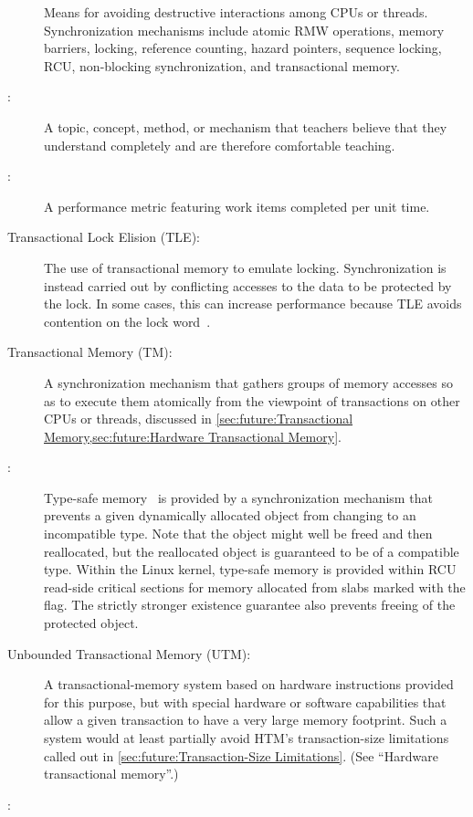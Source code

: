 \begin{description}
	Means for avoiding destructive interactions among CPUs or threads.
	Synchronization mechanisms include atomic RMW operations, memory
	barriers, locking, reference counting, hazard pointers, sequence
	locking, RCU, non-blocking synchronization, and transactional
	memory.
\item[\IXG{Teachable}:]
	A topic, concept, method, or mechanism that teachers believe that
	they understand completely and are therefore comfortable teaching.
\item[\IXG{Throughput}:]
	A performance metric featuring work items completed per unit time.
\item[Transactional Lock Elision (TLE):]
	The use of transactional memory to emulate locking.
	Synchronization is instead carried out by conflicting accesses
	to the data to be protected by the lock.
	In some cases, this can increase performance because TLE
	avoids contention on the lock
	word~\cite{MartinPohlack2011HTM2TLE,Kleen:2014:SEL:2566590.2576793,PascalFelber2016rwlockElision,SeongJaePark2020HTMRCUlock}.
\item[Transactional Memory (TM):]
	A synchronization mechanism that gathers groups of memory
	accesses so as to execute them atomically from the viewpoint
	of transactions on other CPUs or threads, discussed in
	\cref{sec:future:Transactional Memory,sec:future:Hardware Transactional Memory}.
\item[\IXG{Type-Safe Memory}:]
	Type-safe memory~\cite{Cheriton96a} is provided by a
	synchronization mechanism that prevents a given dynamically
	allocated object from changing to an incompatible type.
	Note that the object might well be freed and then reallocated, but
	the reallocated object is guaranteed to be of a compatible type.
	Within the Linux kernel, type-safe memory is provided within
	RCU read-side critical sections for memory allocated from slabs
	marked with the  flag.
	The strictly stronger existence guarantee also prevents freeing
	of the protected object.
\item[Unbounded Transactional Memory (UTM):]
	A transactional-memory system based on hardware instructions
	provided for this purpose, but with special hardware or
	software capabilities that allow a given transaction to
	have a very large memory footprint.
	Such a system would at least partially avoid
	HTM's transaction-size limitations called out in
	\cref{sec:future:Transaction-Size Limitations}.
	(See ``Hardware transactional memory''.)
\item[\IXG{Unfairness}:]

\end{description}
